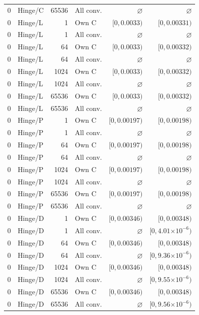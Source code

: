 \begin{longtable}{llrlrr}
0 & Hinge/C & 65536 & All conv. & $\varnothing$ & $\varnothing$ \\
0 & Hinge/L & 1 & Own C & $[0, 0.0033)$ & $[0, 0.00331)$ \\
0 & Hinge/L & 1 & All conv. & $\varnothing$ & $\varnothing$ \\
0 & Hinge/L & 64 & Own C & $[0, 0.0033)$ & $[0, 0.00332)$ \\
0 & Hinge/L & 64 & All conv. & $\varnothing$ & $\varnothing$ \\
0 & Hinge/L & 1024 & Own C & $[0, 0.0033)$ & $[0, 0.00332)$ \\
0 & Hinge/L & 1024 & All conv. & $\varnothing$ & $\varnothing$ \\
0 & Hinge/L & 65536 & Own C & $[0, 0.0033)$ & $[0, 0.00332)$ \\
0 & Hinge/L & 65536 & All conv. & $\varnothing$ & $\varnothing$ \\
0 & Hinge/P & 1 & Own C & $[0, 0.00197)$ & $[0, 0.00198)$ \\
0 & Hinge/P & 1 & All conv. & $\varnothing$ & $\varnothing$ \\
0 & Hinge/P & 64 & Own C & $[0, 0.00197)$ & $[0, 0.00198)$ \\
0 & Hinge/P & 64 & All conv. & $\varnothing$ & $\varnothing$ \\
0 & Hinge/P & 1024 & Own C & $[0, 0.00197)$ & $[0, 0.00198)$ \\
0 & Hinge/P & 1024 & All conv. & $\varnothing$ & $\varnothing$ \\
0 & Hinge/P & 65536 & Own C & $[0, 0.00197)$ & $[0, 0.00198)$ \\
0 & Hinge/P & 65536 & All conv. & $\varnothing$ & $\varnothing$ \\
0 & Hinge/D & 1 & Own C & $[0, 0.00346)$ & $[0, 0.00348)$ \\
0 & Hinge/D & 1 & All conv. & $\varnothing$ & $[0, 4.01\mathord{\times}10^{-6})$ \\
0 & Hinge/D & 64 & Own C & $[0, 0.00346)$ & $[0, 0.00348)$ \\
0 & Hinge/D & 64 & All conv. & $\varnothing$ & $[0, 9.36\mathord{\times}10^{-6})$ \\
0 & Hinge/D & 1024 & Own C & $[0, 0.00346)$ & $[0, 0.00348)$ \\
0 & Hinge/D & 1024 & All conv. & $\varnothing$ & $[0, 9.55\mathord{\times}10^{-6})$ \\
0 & Hinge/D & 65536 & Own C & $[0, 0.00346)$ & $[0, 0.00348)$ \\
0 & Hinge/D & 65536 & All conv. & $\varnothing$ & $[0, 9.56\mathord{\times}10^{-6})$ \\

\end{longtable}
